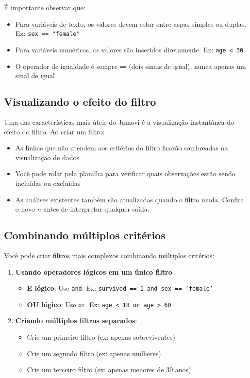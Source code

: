 É importante observar que:
\begin{itemize}
    \item Para variáveis de texto, os valores devem estar entre aspas simples ou duplas. Ex: \texttt{sex == "female"}
    \item Para variáveis numéricas, os valores são inseridos diretamente. Ex: \texttt{age < 30}
    \item O operador de igualdade é sempre \texttt{==} (dois sinais de igual), nunca apenas um sinal de igual
\end{itemize}

\subsection{Visualizando o efeito do filtro}

Uma das características mais úteis do Jamovi é a visualização instantânea do efeito do filtro. Ao criar um filtro:

\begin{itemize}
    \item As linhas que não atendem aos critérios do filtro ficarão sombreadas na visualização de dados
    \item Você pode rolar pela planilha para verificar quais observações estão sendo incluídas ou excluídas
    \item As análises existentes também são atualizadas quando o filtro muda. Confira o novo $n$ antes de interpretar qualquer saída.
\end{itemize}

\subsection{Combinando múltiplos critérios}

Você pode criar filtros mais complexos combinando múltiplos critérios:

\begin{enumerate}
    \item \textbf{Usando operadores lógicos em um único filtro}:
    \begin{itemize}
        \item \textbf{E lógico}: Use \texttt{and}. Ex: \texttt{survived == 1 and sex == 'female'}
        \item \textbf{OU lógico}: Use \texttt{or}. Ex: \texttt{age < 18 or age > 60}
    \end{itemize}
    
    \item \textbf{Criando múltiplos filtros separados}:
    \begin{itemize}
        \item Crie um primeiro filtro (ex: apenas sobreviventes)
        \item Crie um segundo filtro (ex: apenas mulheres)
        \item Crie um terceiro filtro (ex: apenas menores de 30 anos)
    \end{itemize}
\end{enumerate}

